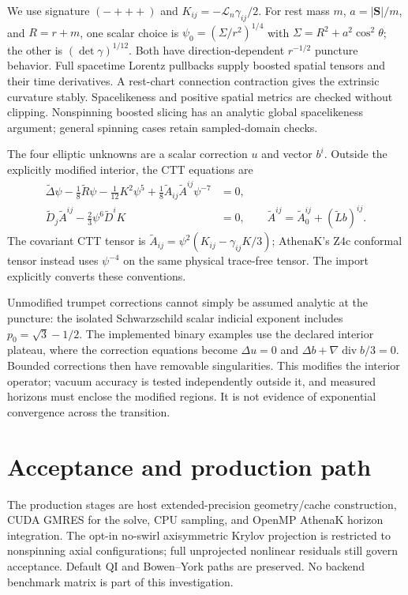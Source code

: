 \documentclass[aps,prd,preprint,notitlepage,nofootinbib]{revtex4-2}
\begin{document}
We use signature $(-+++)$ and $K_{ij}=-\mathcal L_n\gamma_{ij}/2$.
For rest mass $m$, $a=|\boldsymbol S|/m$, and $R=r+m$, one scalar choice is
$\psi_0=(\Sigma/r^2)^{1/4}$ with
$\Sigma=R^2+a^2\cos^2\theta$; the other is $(\det\gamma)^{1/12}$.
Both have direction-dependent $r^{-1/2}$ puncture behavior. Full spacetime
Lorentz pullbacks supply boosted spatial tensors and their time derivatives.
A rest-chart connection contraction gives the extrinsic curvature stably.
Spacelikeness and positive spatial metrics are checked without clipping.
Nonspinning boosted slicing has an analytic global spacelikeness argument;
general spinning cases retain sampled-domain checks.

The four elliptic unknowns are a scalar correction $u$ and vector $b^i$.
Outside the explicitly modified interior, the CTT equations are
\begin{align*}
 \widetilde\Delta\psi-\tfrac18\widetilde R\psi
 -\tfrac1{12}K^2\psi^5+\tfrac18\widetilde A_{ij}\widetilde A^{ij}\psi^{-7}&=0,\\
 \widetilde D_j\widetilde A^{ij}-\tfrac23\psi^6\widetilde D^iK&=0,
 \qquad \widetilde A^{ij}=\widetilde A_0^{ij}+(\widetilde Lb)^{ij}.
\end{align*}
The covariant CTT tensor is $\widetilde A_{ij}=\psi^2(K_{ij}-\gamma_{ij}K/3)$;
AthenaK's Z4c conformal tensor instead uses $\psi^{-4}$ on the same physical
trace-free tensor. The import explicitly converts these conventions.

Unmodified trumpet corrections cannot simply be assumed analytic at the
puncture: the isolated Schwarzschild scalar indicial exponent includes
$p_0=\sqrt3-1/2$. The implemented binary examples use the declared interior
plateau, where the correction equations become
$\Delta u=0$ and $\Delta b+\nabla\operatorname{div}b/3=0$.
Bounded corrections then have removable singularities. This modifies the
interior operator; vacuum accuracy is tested independently outside it, and
measured horizons must enclose the modified regions. It is not evidence of
exponential convergence across the transition.

\section{Acceptance and production path}
The production stages are host extended-precision geometry/cache construction,
CUDA GMRES for the solve, CPU sampling, and OpenMP AthenaK horizon integration.
The opt-in no-swirl axisymmetric Krylov projection is restricted to nonspinning
axial configurations; full unprojected nonlinear residuals still govern acceptance.
Default QI and Bowen--York paths are preserved. No backend benchmark matrix is
part of this investigation.
\end{document}
